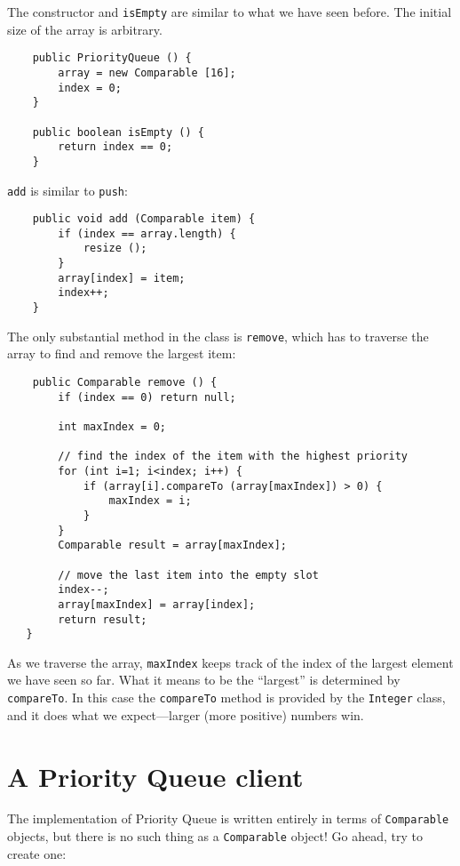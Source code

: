 
The constructor and {\tt isEmpty} are similar to what we have seen
before.  The initial size of the array is arbitrary.

\begin{verbatim}
    public PriorityQueue () {
        array = new Comparable [16];
        index = 0;
    }

    public boolean isEmpty () {
        return index == 0;
    }
\end{verbatim}
%
{\tt add} is similar to {\tt push}:

\begin{verbatim}
    public void add (Comparable item) {
        if (index == array.length) {
            resize ();
        }
        array[index] = item;
        index++;
    }
\end{verbatim}
%
The only substantial method in the class is {\tt remove}, which has
to traverse the array to find and remove the largest item:

\begin{verbatim}
    public Comparable remove () {
        if (index == 0) return null;

        int maxIndex = 0;

        // find the index of the item with the highest priority
        for (int i=1; i<index; i++) {
            if (array[i].compareTo (array[maxIndex]) > 0) {
                maxIndex = i;
            }
        }
        Comparable result = array[maxIndex];

        // move the last item into the empty slot
        index--;
        array[maxIndex] = array[index];
        return result;
   }
\end{verbatim}
%
As we traverse the array, {\tt maxIndex} keeps track of the
index of the largest element we have seen so far.  What it
means to be the ``largest'' is determined by {\tt compareTo}.
In this case the {\tt compareTo} method is provided by the
{\tt Integer} class, and it does what we expect---larger
(more positive) numbers win.


\section {A Priority Queue client}

The implementation of Priority Queue is written entirely
in terms of {\tt Comparable} objects, but there is no
such thing as a {\tt Comparable} object!  Go ahead, try
to create one:

